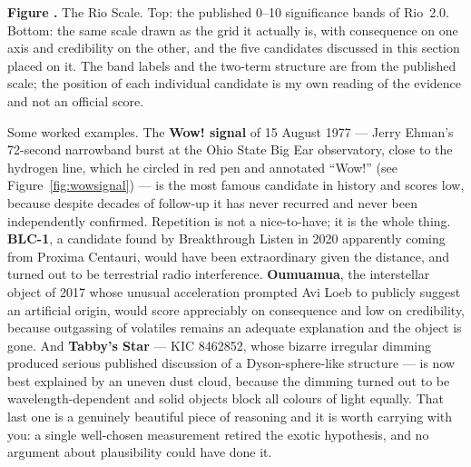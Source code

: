 \Needspace*{4.2in}
\begin{center}
\label{fig:rioscale}%
\begin{figpanel}[width=0.96\textwidth]
\centering
{\setlength{\fboxsep}{0pt}\setlength{\fboxrule}{0.5pt}%
}\par\vspace{3pt}
{\RaggedRight\scriptsize\color{steel}\textbf{\textcolor{ufogreenink}{Figure \thefigph.}}
The Rio Scale. Top: the published 0--10 significance bands of Rio~2.0. Bottom: the same scale drawn
as the grid it actually is, with consequence on one axis and credibility on the other, and the five
candidates discussed in this section placed on it. The band labels and the two-term structure are
from the published scale; the position of each individual candidate is my own reading of the
evidence and not an official score.\par
{}\par}
\end{figpanel}
\end{center}
\vspace{6pt}

Some worked examples. The \textbf{Wow! signal} of 15 August 1977 --- Jerry Ehman's 72-second
narrowband burst at the Ohio State Big Ear observatory, close to the hydrogen line, which he circled in red pen and annotated ``Wow!'' (see Figure~\ref{fig:wowsignal}) --- is the most famous candidate in history and scores low, because
despite decades of follow-up it has never recurred and never been independently confirmed. Repetition
is not a nice-to-have; it is the whole thing. \textbf{BLC-1}, a candidate found by Breakthrough Listen
in 2020 apparently coming from Proxima Centauri, would have been extraordinary given the distance,
and turned out to be terrestrial radio interference. \textbf{Oumuamua}, the interstellar object of
2017 whose unusual acceleration prompted Avi Loeb to publicly suggest an artificial origin, would
score appreciably on consequence and low on credibility, because outgassing of volatiles remains an
adequate explanation and the object is gone. And \textbf{Tabby's Star} --- KIC 8462852, whose bizarre
irregular dimming produced serious published discussion of a Dyson-sphere-like structure --- is now
best explained by an uneven dust cloud, because the dimming turned out to be wavelength-dependent and
solid objects block all colours of light equally. That last one is a genuinely beautiful piece of
reasoning and it is worth carrying with you: a single well-chosen measurement retired the exotic
hypothesis, and no argument about plausibility could have done it.

